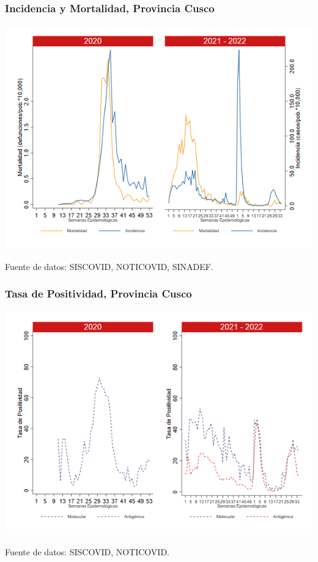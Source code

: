 \documentclass[xcolor=table]{beamer}
\begin{document}
\begin{frame}[label=Cusco]
	\frametitle{Incidencia y Mortalidad, Provincia Cusco}
	\vspace{-.5cm}
	\begin{center}
		\includegraphics[width=0.8\linewidth, trim={0cm .5cm 0cm 0.2cm},clip]{../figuras/incidencia_mortalidad_20_21_7.png}
	\end{center}
	{\tiny Fuente de datos: SISCOVID, NOTICOVID, SINADEF.}
\end{frame}

\begin{frame}
	\frametitle{Tasa de Positividad, Provincia Cusco}
	\vspace{-.5cm}
	\begin{center}
		\includegraphics[width=0.8\linewidth, trim={0cm .5cm 0cm 0.2cm},clip]{../figuras/positividad_20_21_7.png}
	\end{center}
	{\tiny Fuente de datos: SISCOVID, NOTICOVID.}
\end{frame}
\end{document}
